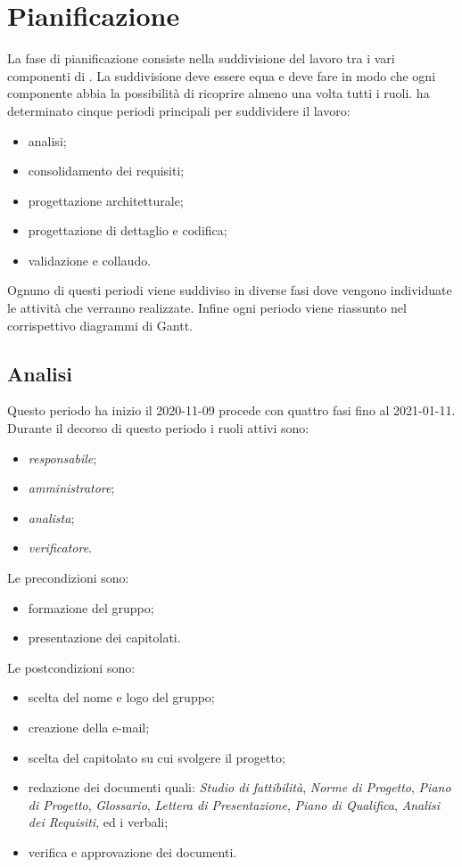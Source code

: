 \section{Pianificazione}
La fase di pianificazione consiste nella suddivisione del lavoro tra i vari componenti di \Gruppo. La suddivisione deve essere equa e deve fare in modo che ogni componente abbia la possibilità di ricoprire almeno una volta tutti i ruoli.
\Gruppo ha determinato cinque periodi principali per suddividere il lavoro:
\begin{itemize}
\item analisi;
\item consolidamento dei requisiti;
\item progettazione architetturale;
\item progettazione di dettaglio e codifica;
\item validazione e collaudo.
\end{itemize}
Ognuno di questi periodi viene suddiviso in diverse fasi dove vengono individuate le attività che verranno realizzate.
Infine ogni periodo viene riassunto nel corrispettivo diagrammi di Gantt.
\subsection{Analisi}
Questo periodo ha inizio il 2020-11-09 procede con quattro fasi fino al 2021-01-11.
Durante il decorso di questo periodo i ruoli attivi sono:
\begin{itemize}
\item \textit{responsabile};
\item \textit{amministratore};
\item \textit{analista};
\item \textit{verificatore}.
\end{itemize}
Le precondizioni sono:
\begin{itemize}
	\item formazione del gruppo;
	\item presentazione dei capitolati.
\end{itemize}
Le postcondizioni sono:
\begin{itemize}
	\item scelta del nome e logo del gruppo;
	\item creazione della e-mail;
	\item scelta del capitolato su cui svolgere il progetto;
	\item redazione dei documenti quali: \textit{Studio di fattibilità}, \textit{Norme di Progetto}, \textit{Piano di Progetto}, \textit{Glossario}, \textit{Lettera di Presentazione}, \textit{Piano di Qualifica}, \textit{Analisi dei Requisiti}, ed i verbali;
	\item verifica e approvazione dei documenti.
\end{itemize}
